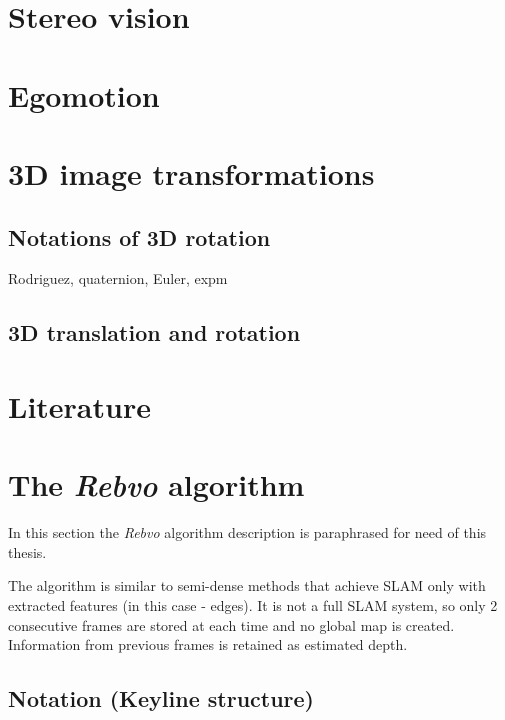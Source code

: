 
\section{Stereo vision}
\label{sec:stereo}



\section{Egomotion}
\label{sec:ego}


\section{3D image transformations}
\label{sec:3dtrans}

\subsection{Notations of 3D rotation}

Rodriguez, quaternion, Euler, expm

\subsection{3D translation and rotation}


\section{Literature}



\section{The \textit{Rebvo} algorithm}

In this section the \textit{Rebvo} algorithm \cite{jose2015realtime} description is paraphrased for need of this thesis.

The algorithm is similar to semi-dense methods that achieve SLAM only with extracted features (in this case - edges). It is not a full SLAM system, so only 2 consecutive frames are stored at each time and no global map is created. Information from previous frames is retained as estimated depth.


\subsection{Notation (Keyline structure)}

